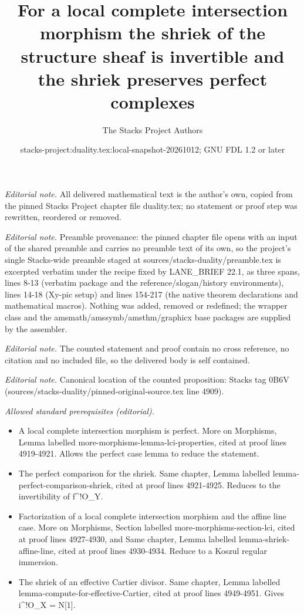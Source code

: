 \documentclass[10pt,a4paper]{amsart}
\title{For a local complete intersection morphism the shriek of the structure sheaf is invertible and the shriek preserves perfect complexes}
\author{The Stacks Project Authors}
\date{stacks-project:duality.tex:local-snapshot-20261012; GNU FDL 1.2 or later}
\theoremstyle{plain}
\theoremstyle{definition}
\theoremstyle{remark}
\numberwithin{equation}{subsection}
\begin{document}
\maketitle
\noindent\textit{Editorial note.} All delivered mathematical text is the author's own, copied from the pinned Stacks Project chapter file duality.tex; no statement or proof step was rewritten, reordered or removed.\par\medskip
\noindent\textit{Editorial note.} Preamble provenance: the pinned chapter file opens with an input of the shared preamble and carries no preamble text of its own, so the project's single Stacks-wide preamble staged at sources/stacks-duality/preamble.tex is excerpted verbatim under the recipe fixed by LANE\_BRIEF 22.1, as three spans, lines 8-13 (verbatim package and the reference/slogan/history environments), lines 14-18 (Xy-pic setup) and lines 154-217 (the native theorem declarations and mathematical macros). Nothing was added, removed or redefined; the wrapper class and the amsmath/amssymb/amsthm/graphicx base packages are supplied by the assembler.\par\medskip
\noindent\textit{Editorial note.} The counted statement and proof contain no cross reference, no citation and no included file, so the delivered body is self contained.\par\medskip
\noindent\textit{Editorial note.} Canonical location of the counted proposition: Stacks tag 0B6V (sources/stacks-duality/pinned-original-source.tex line 4909).\par\medskip
\noindent\textit{Allowed standard prerequisites (editorial).}\begin{itemize}
\item A local complete intersection morphism is perfect. More on Morphisms, Lemma labelled more-morphisms-lemma-lci-properties, cited at proof lines 4919-4921. Allows the perfect case lemma to reduce the statement.
\item The perfect comparison for the shriek. Same chapter, Lemma labelled lemma-perfect-comparison-shriek, cited at proof lines 4921-4925. Reduces to the invertibility of f\textasciicircum{}!O\_Y.
\item Factorization of a local complete intersection morphism and the affine line case. More on Morphisms, Section labelled more-morphisms-section-lci, cited at proof lines 4927-4930, and Same chapter, Lemma labelled lemma-shriek-affine-line, cited at proof lines 4930-4934. Reduce to a Koszul regular immersion.
\item The shriek of an effective Cartier divisor. Same chapter, Lemma labelled lemma-compute-for-effective-Cartier, cited at proof lines 4949-4951. Gives i\textasciicircum{}!O\_X = N[1].
\end{itemize}\medskip
\end{document}
